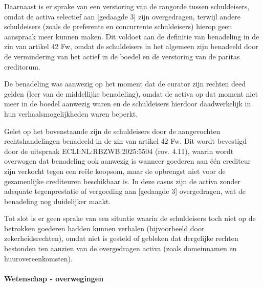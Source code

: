 \documentclass[
  dutch,
  a4paper,
]{article}
\begin{document}
Daarnaast is er sprake van een verstoring van de rangorde tussen schuldeisers, omdat de activa selectief aan {[}gedaagde 3{]} zijn overgedragen, terwijl andere schuldeisers (zoals de preferente en concurrente schuldeisers) hierop geen aanspraak meer kunnen maken. Dit voldoet aan de definitie van benadeling in de zin van artikel 42 Fw, omdat de schuldeisers in het algemeen zijn benadeeld door de vermindering van het actief in de boedel en de verstoring van de paritas creditorum.

De benadeling was aanwezig op het moment dat de curator zijn rechten deed gelden (leer van de middellijke benadeling), omdat de activa op dat moment niet meer in de boedel aanwezig waren en de schuldeisers hierdoor daadwerkelijk in hun verhaalsmogelijkheden waren beperkt.

Gelet op het bovenstaande zijn de schuldeisers door de aangevochten rechtshandelingen benadeeld in de zin van artikel 42 Fw. Dit wordt bevestigd door de uitspraak ECLI:NL:RBZWB:2025:5504 (rov. 4.11), waarin wordt overwogen dat benadeling ook aanwezig is wanneer goederen aan één crediteur zijn verkocht tegen een reële koopsom, maar de opbrengst niet voor de gezamenlijke crediteuren beschikbaar is. In deze casus zijn de activa zonder adequate tegenprestatie of vergoeding aan {[}gedaagde 3{]} overgedragen, wat de benadeling nog duidelijker maakt.

Tot slot is er geen sprake van een situatie waarin de schuldeisers toch niet op de betrokken goederen hadden kunnen verhalen (bijvoorbeeld door zekerheidsrechten), omdat niet is gesteld of gebleken dat dergelijke rechten bestonden ten aanzien van de overgedragen activa (zoals domeinnamen en huurovereenkomsten).

\paragraph{Wetenschap - overwegingen}\label{wetenschap---overwegingen-24}
\end{document}
